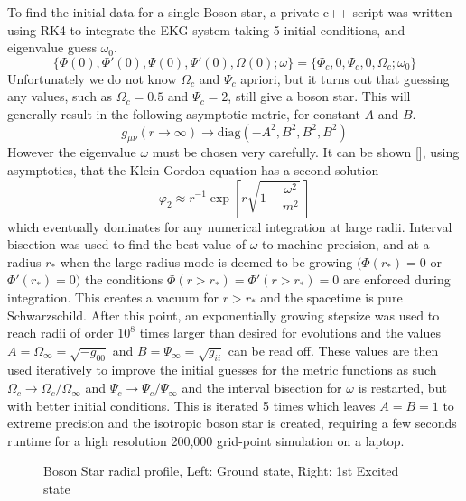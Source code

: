 \documentclass[11pt, oneside]{report}  %
\newcommand{\vp}{\varphi}
\numberwithin{equation}{section}
\begin{document}
To find the initial data for a single Boson star, a private c++ script was written using RK4 to integrate the EKG system taking 5 initial conditions, and eigenvalue guess $\omega_0$. 
\begin{equation} \{\Phi(0),\Phi'(0),\Psi(0),\Psi'(0),\Omega(0);\omega \} = \{ \Phi_c,0,\Psi_c,0,\Omega_c;\omega_0\}\end{equation}
Unfortunately we do not know $\Omega_c$ and $\Psi_c$ apriori, but it turns out that guessing any values, such as $\Omega_c=0.5$ and $\Psi_c=2$, still give a boson star. This will generally result in the following asymptotic metric, for constant $A$ and $B$.
\begin{equation} g_{\mu\nu}(r\rightarrow\infty) \rightarrow \mathrm{diag}(-A^2,B^2,B^2,B^2)\end{equation}
However the eigenvalue $\omega$ must be chosen very carefully. It can be shown [], using asymptotics, that the Klein-Gordon equation has a second solution 
\begin{equation}\vp_2 \approx r^{-1}\exp[r\sqrt{1-\frac{\omega^2}{m^2}}\,]\end{equation}
 which eventually dominates for any numerical integration at large radii. Interval bisection was used to find the best value of $\omega$ to machine precision, and at a radius $r_*$ when the large radius mode is deemed to be growing $(\Phi(r_*)=0$ or $\Phi'(r_*)=0)$ the conditions $\Phi(r>r_*)=\Phi'(r>r_*)=0$ are enforced during integration. This creates a vacuum for $r>r_*$ and the spacetime is pure Schwarzschild. After this point, an exponentially growing stepsize was used to reach radii of order $10^8$ times larger than desired for evolutions and the values $A = \Omega_\infty= \sqrt{-g_{00}}$ and $B=\Psi_{\infty}=\sqrt{g_{ii}}$ can be read off. These values are then used iteratively to improve the initial guesses for the metric functions as such $\Omega_c \rightarrow \Omega_c / \Omega_\infty$ and $\Psi_c \rightarrow \Psi_c / \Psi_\infty$ and the interval bisection for $\omega$ is restarted, but with better initial conditions. This is iterated 5 times which leaves $A=B=1$ to extreme precision and the isotropic boson star is created, requiring a few seconds runtime for a high resolution 200,000 grid-point simulation on a laptop.



  \begin{figure}[H]
  \caption{Boson Star radial profile, Left: Ground state, Right: 1st Excited state}
  \centering
  \hfill
\end{figure}
\end{document}
